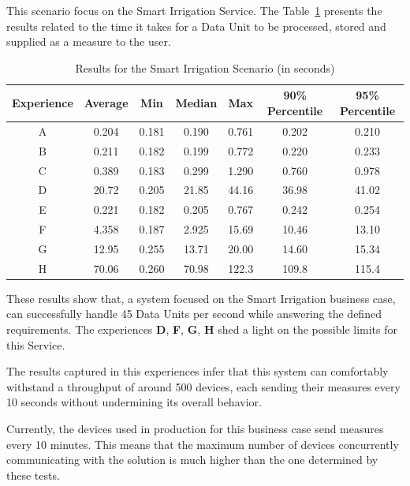This scenario focus on the Smart Irrigation Service. The Table~\ref{tab:evaluation:experiences:irrigation:results} presents the results related to the time it takes for a Data Unit to be processed, stored and supplied as a measure to the user.

\begin{table}[H]
    \caption{Results for the Smart Irrigation Scenario (in seconds)}
    \label{tab:evaluation:experiences:irrigation:results}
    \centering
    \begin{tabular}{@{}ccccccc@{}}
    \toprule
    \textbf{Experience} & \textbf{Average} & \textbf{Min} & \textbf{Median} & \textbf{Max} & \textbf{90\% Percentile} & \textbf{95\% Percentile} \\ \midrule
    A & 0.204 & 0.181 & 0.190 & 0.761 & 0.202 & 0.210 \\ \midrule
    B & 0.211 & 0.182 & 0.199 & 0.772 & 0.220 & 0.233 \\ \midrule
    C & 0.389 & 0.183 & 0.299 & 1.290 & 0.760 & 0.978 \\ \midrule
    D & 20.72 & 0.205 & 21.85 & 44.16 & 36.98 & 41.02 \\ \midrule
    E & 0.221 & 0.182 & 0.205 & 0.767 & 0.242 & 0.254 \\ \midrule
    F & 4.358 & 0.187 & 2.925 & 15.69 & 10.46 & 13.10 \\ \midrule
    G & 12.95 & 0.255 & 13.71 & 20.00 & 14.60 & 15.34 \\ \midrule
    H & 70.06 & 0.260 & 70.98 & 122.3 & 109.8 & 115.4 \\ \bottomrule
    \end{tabular}
\end{table}

These results show that, a system focused on the Smart Irrigation business case, can successfully handle 45 Data Units per second while answering the defined requirements. The experiences \textbf{D}, \textbf{F}, \textbf{G}, \textbf{H} shed a light on the possible limits for this Service.

The results captured in this experiences infer that this system can comfortably withstand a throughput of around 500 devices, each sending their measures every 10 seconds without undermining its overall behavior.

Currently, the devices used in production for this business case send measures every 10 minutes. This means that the maximum number of devices concurrently communicating with the solution is much higher than the one determined by these tests.

